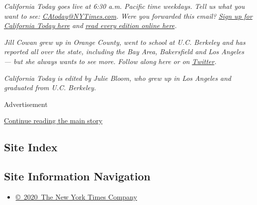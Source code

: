 \emph{California Today goes live at 6:30 a.m. Pacific time weekdays.
Tell us what you want to see:}
\href{mailto:CAtoday@NYTimes.com}{\emph{CAtoday@NYTimes.com}}\emph{.
Were you forwarded this email?}
\href{https://www.nytimes3xbfgragh.onion/newsletters/california-today?module=inline}{\emph{Sign
up for California Today here}} \emph{and}
\href{https://www.nytimes3xbfgragh.onion/column/california-today}{\emph{read
every edition online here}}\emph{.}

\emph{Jill Cowan grew up in Orange County, went to school at U.C.
Berkeley and has reported all over the state, including the Bay Area,
Bakersfield and Los Angeles --- but she always wants to see more. Follow
along here or on}
\href{https://twitter.com/JillCowan}{\emph{Twitter}}\emph{.}

\emph{California Today is edited by Julie Bloom, who grew up in Los
Angeles and graduated from U.C. Berkeley.}

Advertisement

\protect\hyperlink{after-bottom}{Continue reading the main story}

\hypertarget{site-index}{%
\subsection{Site Index}\label{site-index}}

\hypertarget{site-information-navigation}{%
\subsection{Site Information
Navigation}\label{site-information-navigation}}

\begin{itemize}
\tightlist
\item
  \href{https://help.nytimes3xbfgragh.onion/hc/en-us/articles/115014792127-Copyright-notice}{©~2020~The
  New York Times Company}
\end{itemize}

